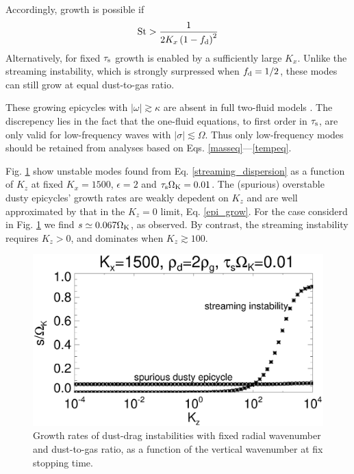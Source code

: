 Accordingly, growth is possible if 
\begin{align}
\mathrm{St} > \frac{1}{2K_x\left(1-f_\mathrm{d}\right)^2}\label{epi_grow_criterion}
\end{align}
Alternatively, for fixed $\tau_\mathrm{s}$ growth is enabled
by a sufficiently large $K_x$. Unlike the streaming instability,
which is strongly surpressed when $f_\mathrm{d}=1/2$, these modes can still
grow at equal dust-to-gas ratio.  

These growing epicycles with $|\omega|\gtrsim \kappa$ are absent in
full two-fluid models \citep{youdin05a}. The discrepency lies in the
fact that the one-fluid equations, to first order in $\tau_\mathrm{s}$, are
only valid for low-frequency waves with $|\sigma|\lesssim 
\Omega$. Thus only low-frequency modes should be retained from
analyses based on Eqs. \ref{masseq}---\ref{tempeq}. 


Fig. \ref{dusty_growth1} show unstable modes found from
Eq. \ref{streaming_dispersion} as a function of $K_z$ at fixed $K_x 
= 1500$, $\epsilon=2$ and $\tau_\mathrm{s}\Omega_{\rm K}=0.01$.  
The (spurious) overstable dusty epicycles' growth
rates are weakly depedent on $K_z$ and are well approximated by
that in the $K_z=0$ limit, Eq. \ref{epi_grow}. 
For the case considerd in Fig. \ref{dusty_growth1} we find
$s\simeq0.067\Omega_{\rm K}$, as observed. By contrast, the streaming
instability requires $K_z>0$, and dominates when
$K_z\gtrsim 100$. 

\begin{figure}
  \includegraphics[width=\linewidth]{figures/streaming2}
  \caption{Growth rates of dust-drag instabilities with fixed radial
    wavenumber and dust-to-gas ratio, as a function of
    the vertical wavenumber at fix stopping time. \label{dusty_growth1}
  }
\end{figure}

